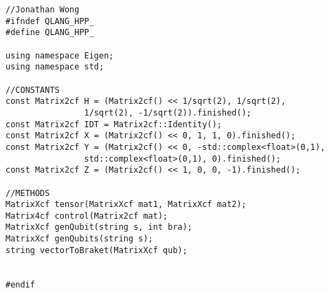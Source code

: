 \begin{lstlisting}
//Jonathan Wong
#ifndef QLANG_HPP_ 
#define QLANG_HPP_

using namespace Eigen;
using namespace std;

//CONSTANTS
const Matrix2cf H = (Matrix2cf() << 1/sqrt(2), 1/sqrt(2),
				1/sqrt(2), -1/sqrt(2)).finished();
const Matrix2cf IDT = Matrix2cf::Identity();
const Matrix2cf X = (Matrix2cf() << 0, 1, 1, 0).finished();
const Matrix2cf Y = (Matrix2cf() << 0, -std::complex<float>(0,1),
				std::complex<float>(0,1), 0).finished();
const Matrix2cf Z = (Matrix2cf() << 1, 0, 0, -1).finished();

//METHODS
MatrixXcf tensor(MatrixXcf mat1, MatrixXcf mat2);
Matrix4cf control(Matrix2cf mat);
MatrixXcf genQubit(string s, int bra);
MatrixXcf genQubits(string s);
string vectorToBraket(MatrixXcf qub);


#endif
\end{lstlisting}